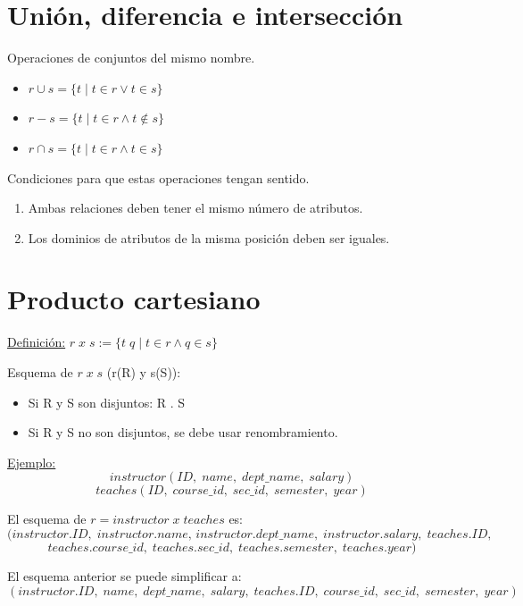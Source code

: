 \documentclass[12pt,a4paper]{report}
\begin{document}
	\section{Unión, diferencia e intersección}
		\par Operaciones de conjuntos del mismo nombre.
		\begin{itemize}
			\item $r \cup s = \lbrace t \; | \; t \in r \lor t \in s \rbrace$
			\item $r - s = \lbrace t \; | \; t \in r \land t \notin s \rbrace$
			\item $r \cap s = \lbrace t \; | \; t \in r \land t \in s \rbrace$
		\end{itemize}
		\par Condiciones para que estas operaciones tengan sentido.
		\begin{enumerate}
			\item Ambas relaciones deben tener el mismo número de atributos.
			\item Los dominios de atributos de la misma posición deben ser iguales.
		\end{enumerate}

	\section{Producto cartesiano}
		\par \underline{Definición:} $r \; x \; s := \lbrace t \; q \; | \; t \in r \land q \in s \rbrace$
		\vspace{5mm}
		\par Esquema de $r \; x \; s$ (r(R) y s(S)):
		\begin{itemize}
			\item Si R y S son disjuntos: R . S
			\item Si R y S no son disjuntos, se debe usar renombramiento.
		\end{itemize}

		\par \underline{Ejemplo:}
		\[instructor(ID, \; name, \; dept\_name, \; salary) \]
		\[teaches(ID, \; course\_id, \; sec\_id, \; semester, \; year) \]
		\par El esquema de $r = instructor \; x \; teaches$ es:
		\[ (instructor.ID, \; instructor.name, \, instructor.dept\_name, \; instructor.salary, \; teaches.ID, \] 		
		\[
		teaches.course\_id, \; teaches.sec\_id, \; teaches.semester, \; teaches.year)
		\]
		\par El esquema anterior se puede simplificar a:
		\[
		(instructor.ID, \; name, \; dept\_name, \; salary, \; teaches.ID, \; course\_id, \; sec\_id, \; semester, \; year) \]
\end{document}
